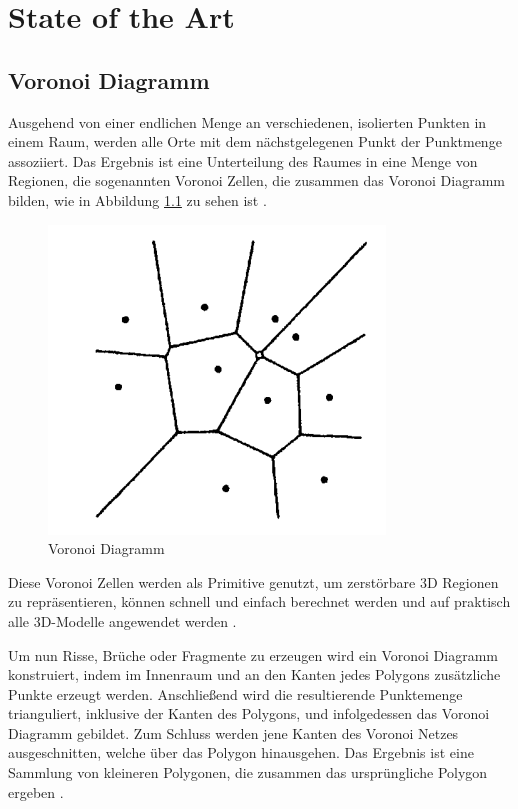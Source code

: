 \chapter{State of the Art}


\section{Voronoi Diagramm}

Ausgehend von einer endlichen Menge an verschiedenen, isolierten Punkten in einem Raum, werden alle Orte mit dem nächstgelegenen Punkt der Punktmenge assoziiert.
Das Ergebnis ist eine Unterteilung des Raumes in eine Menge von Regionen, die sogenannten Voronoi Zellen, die zusammen das Voronoi Diagramm bilden, 
wie in Abbildung \ref{fig:voronoi1} zu sehen ist \cite{Okabe.SpatialTessellationsVoronoi}.


\begin{figure}[H]
    \centering
    \includegraphics[width=0.35\linewidth]{PICs/basicVoronoi.PNG}
    \caption{Voronoi Diagramm \protect\cite{Okabe.SpatialTessellationsVoronoi}}
    \label{fig:voronoi1}
\end{figure}

Diese Voronoi Zellen werden als Primitive genutzt, um zerstörbare 3D Regionen zu repräsentieren, können schnell und einfach berechnet werden und auf praktisch alle 3D-Modelle
angewendet werden \cite{Najim.DynamicFracturing}.

Um nun Risse, Brüche oder Fragmente zu erzeugen wird ein Voronoi Diagramm konstruiert, indem im Innenraum und an den Kanten jedes Polygons zusätzliche Punkte erzeugt werden. 
Anschließend wird die resultierende Punktemenge trianguliert, inklusive der Kanten des Polygons, und infolgedessen das Voronoi Diagramm gebildet. 
Zum Schluss werden jene Kanten des Voronoi Netzes ausgeschnitten, welche über das Polygon hinausgehen. Das Ergebnis ist eine Sammlung von kleineren Polygonen, die zusammen
das ursprüngliche Polygon ergeben \cite{Raghavachary.FractureGenerationOnPolygonalMeshes}.

